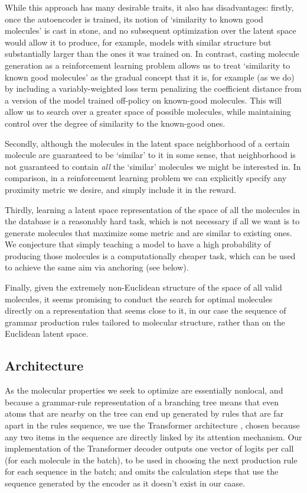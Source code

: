 \documentclass[11pt]{article}
\begin{document}
While this approach has many desirable traits, it also has disadvantages: firstly, once the autoencoder is trained, its notion of `similarity to known good molecules' is cast in stone, and no subsequent optimization over the latent space would allow it to produce, for example, models with similar structure but substantially larger than the ones it was trained on. In contrast, casting molecule generation as a reinforcement learning problem allows us to treat `similarity to known good molecules' as the gradual concept that it is, for example (as we do) by including a variably-weighted loss term penalizing the coefficient distance from a version of the model trained off-policy on known-good molecules. This will allow us to search over a greater space of possible molecules, while maintaining control over the degree of similarity to the known-good ones.

Secondly, although the molecules in the latent space neighborhood of a certain molecule are guaranteed to be `similar' to it in some sense, that neighborhood is not guaranteed to contain \emph{all} the `similar' molecules we might be interested in. In comparison, in a reinforcement learning problem we can explicitly specify any proximity metric we desire, and simply include it in the reward. 

Thirdly, learning a latent space representation of the space of all the molecules in the database is a reasonably hard task, which is not necessary if all we want is to generate molecules that maximize some metric and are similar to existing ones. We conjecture that simply teaching a model to have a high probability of producing those molecules is a computationally cheaper task, which can be used to achieve the same aim via anchoring (see below).

Finally, given the extremely non-Euclidean structure of the space of all valid molecules, it seems promising to conduct the search for optimal molecules directly on a representation that seems close to it, in our case the sequence of grammar production rules tailored to molecular structure, rather than on the Euclidean latent space. 
\subsection{Architecture}
As the molecular properties we seek to optimize are essentially nonlocal, and because a grammar-rule representation of a branching tree means that even atoms that are nearby on the tree can end up generated by rules that are far apart in the rules sequence, we use the Transformer architecture \cite{Transformer17}, chosen because any two items in the sequence are directly linked by its attention mechanism. Our implementation of the Transformer decoder outputs one vector of logits per call (for each molecule in the batch), to be used in choosing the next production rule for each sequence in the batch; and omits the calculation steps that use the sequence generated by the encoder as it doesn't exist in our caase.
\end{document}
